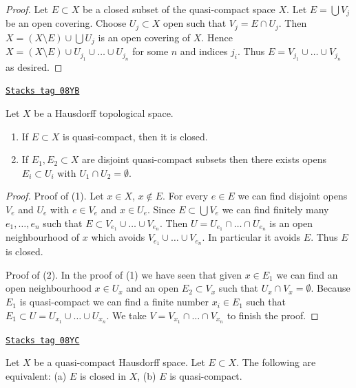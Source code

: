 \begin{proof}
Let $E \subset X$ be a closed subset of the quasi-compact space $X$.
Let $E = \bigcup V_j$ be an open covering. Choose $U_j \subset X$
open such that $V_j = E \cap U_j$. Then $X = (X \setminus E) \cup \bigcup U_j$
is an open covering of $X$. Hence
$X = (X \setminus E) \cup U_{j_1} \cup \ldots \cup U_{j_n}$ for some
$n$ and indices $j_i$. Thus $E = V_{j_1} \cup \ldots \cup V_{j_n}$
as desired.
\end{proof}

\begin{lemma}
\label{topology-lemma-quasi-compact-in-Hausdorff}
\href{https://stacks.math.columbia.edu/tag/08YB}{\texttt{Stacks tag 08YB}}

Let $X$ be a Hausdorff topological space.
\begin{enumerate}
\item If $E \subset X$ is quasi-compact, then it is closed.
\item If $E_1, E_2 \subset X$ are disjoint quasi-compact subsets
then there exists opens $E_i \subset U_i$ with $U_1 \cap U_2 = \emptyset$.
\end{enumerate}
\end{lemma}

\begin{proof}
Proof of (1). Let $x \in X$, $x \not \in E$.
For every $e \in E$ we can find disjoint opens $V_e$ and $U_e$
with $e \in V_e$ and $x \in U_e$. Since $E \subset \bigcup V_e$
we can find finitely many $e_1, \ldots, e_n$ such that
$E \subset V_{e_1} \cup \ldots \cup V_{e_n}$. Then
$U = U_{e_1} \cap \ldots \cap U_{e_n}$ is an open neighbourhood
of $x$ which avoids $V_{e_1} \cup \ldots \cup V_{e_n}$. In particular
it avoids $E$. Thus $E$ is closed.

\medskip\noindent
Proof of (2). In the proof of (1) we have seen that given $x \in E_1$
we can find an open neighbourhood $x \in U_x$ and an open
$E_2 \subset V_x$ such that $U_x \cap V_x = \emptyset$. Because
$E_1$ is quasi-compact we can find a finite number $x_i \in E_1$
such that $E_1 \subset U = U_{x_1} \cup \ldots \cup U_{x_n}$.
We take $V = V_{x_1} \cap \ldots \cap V_{x_n}$ to finish the proof.
\end{proof}

\begin{lemma}
\label{topology-lemma-closed-in-compact}
\href{https://stacks.math.columbia.edu/tag/08YC}{\texttt{Stacks tag 08YC}}

Let $X$ be a quasi-compact Hausdorff space. Let $E \subset X$.
The following are equivalent: (a) $E$ is closed in $X$, (b)
$E$ is quasi-compact.
\end{lemma}

